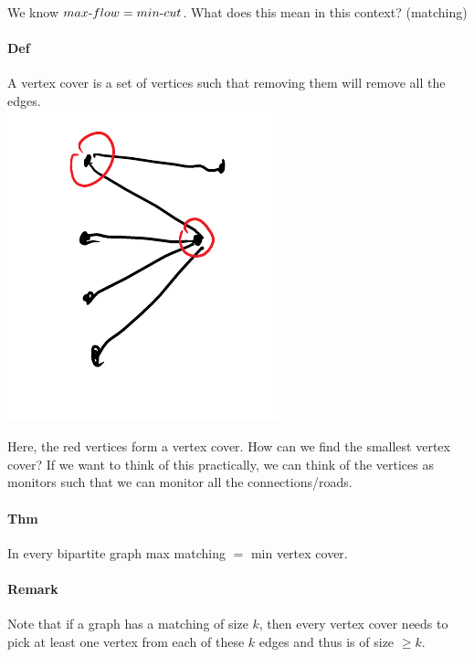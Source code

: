 \documentclass[12 pt]{article}
\begin{document}
        We know $max\hbox{-}flow=min\hbox{-}cut$. What does this mean
        in this context? (matching)
        \paragraph{Def}A vertex cover is a set of vertices such that
        removing them will remove all the edges.
        \\ \includegraphics[width=.7\textwidth]{i55.pdf}

        Here, the red vertices form a vertex cover. How can we find
        the smallest vertex cover? If we want to think of this
        practically, we can think of the vertices as monitors such
        that we can monitor all the connections/roads.
        \paragraph{Thm} In every bipartite graph max matching $=$ min
        vertex cover.

        \paragraph{Remark} Note that if a graph has a matching of size
        $k$, then every vertex cover needs to pick at least one vertex
        from each of these $k$ edges and thus is of size $\geq k$.
\end{document}
